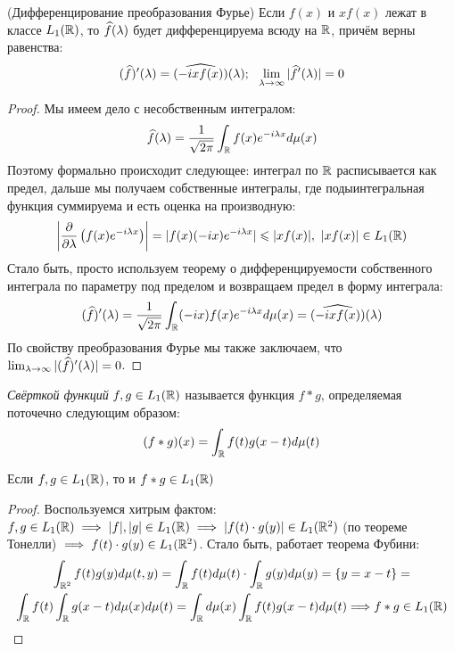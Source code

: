 \begin{theorem} (Дифференцирование преобразования Фурье)
	Если $f(x)$ и $xf(x)$ лежат в классе $L_1(\mathbb{R})$, то $\widehat{f}(\lambda)$ будет дифференцируема всюду на $\mathbb{R}$, причём верны равенства:
	\[
		(\widehat{f})'(\lambda) = \widehat{(-ixf(x))}(\lambda);\ \ \lim_{\lambda \to \infty} |\widehat{f}'(\lambda)| = 0
	\]
\end{theorem}

\begin{proof}
	Мы имеем дело с несобственным интегралом:
	\[
		\widehat{f}(\lambda) = \frac{1}{\sqrt{2\pi}} \int_{\mathbb{R}} f(x)e^{-i\lambda x}d\mu(x)
	\]
	Поэтому формально происходит следующее: интеграл по $\mathbb{R}$ расписывается как предел, дальше мы получаем собственные интегралы, где подыинтегральная функция суммируема и есть оценка на производную:
	\[
		\left|\frac{\partial }{\partial \lambda}\left(f(x)e^{-i\lambda x}\right)\right| = |f(x)(-ix)e^{-i\lambda x}| \leqslant |xf(x)|,\ |xf(x)| \in L_1(\mathbb{R})
	\]
	Стало быть, просто используем теорему о дифференцируемости собственного интеграла по параметру под пределом и возвращаем предел в форму интеграла:
	\[
		(\widehat{f})'(\lambda) = \frac{1}{\sqrt{2\pi}} \int_{\mathbb{R}} (-ix)f(x)e^{-i\lambda x}d\mu(x) = (\widehat{-ixf(x)})(\lambda)
	\]
	По свойству преобразования Фурье мы также заключаем, что $\lim_{\lambda \to \infty} |(\widehat{f})'(\lambda)| = 0$.
\end{proof}

\begin{definition}
	\textit{Свёрткой функций} $f, g \in L_1(\mathbb{R})$ называется функция $f * g$, определяемая поточечно следующим образом:
	\[
		(f * g)(x) = \int_{\mathbb{R}} f(t)g(x - t)d\mu(t)
	\]
\end{definition}

\begin{proposition}
	Если $f, g \in L_1(\mathbb{R})$, то и $f * g \in L_1(\mathbb{R})$
\end{proposition}

\begin{proof}
	Воспользуемся хитрым фактом: $f, g \in L_1(\mathbb{R}) \implies |f|, |g| \in L_1(\mathbb{R}) \implies |f(t) \cdot g(y)| \in L_1(\mathbb{R}^2)$ (по теореме Тонелли) $\implies f(t) \cdot g(y) \in L_1(\mathbb{R}^2)$. Стало быть, работает теорема Фубини:
	\begin{multline*}
		\int_{\mathbb{R}^2} f(t)g(y)d\mu(t, y) = \int_{\mathbb{R}} f(t)d\mu(t) \cdot \int_{\mathbb{R}} g(y)d\mu(y) = \{y = x - t\} =
		\\
		\int_{\mathbb{R}} f(t) \int_{\mathbb{R}} g(x - t)d\mu(x)d\mu(t) = \int_{\mathbb{R}} d\mu(x) \int_{\mathbb{R}} f(t)g(x - t)d\mu(t) \Longrightarrow f * g \in L_1(\mathbb{R})
	\end{multline*}
\end{proof}

